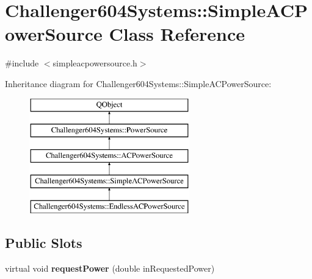 \hypertarget{class_challenger604_systems_1_1_simple_a_c_power_source}{\section{Challenger604\-Systems\-:\-:Simple\-A\-C\-Power\-Source Class Reference}
\label{class_challenger604_systems_1_1_simple_a_c_power_source}
}


{\ttfamily \#include $<$simpleacpowersource.\-h$>$}

Inheritance diagram for Challenger604\-Systems\-:\-:Simple\-A\-C\-Power\-Source\-:\begin{figure}[H]
\begin{center}
\leavevmode
\includegraphics[height=5.000000cm]{class_challenger604_systems_1_1_simple_a_c_power_source}
\end{center}
\end{figure}
\subsection*{Public Slots}
\begin{DoxyCompactItemize}
\item 
\hypertarget{class_challenger604_systems_1_1_simple_a_c_power_source_a9f35b05f8a01cd0baa2d6de5fc1df083}{virtual void {\bfseries request\-Power} (double in\-Requested\-Power)}\label{class_challenger604_systems_1_1_simple_a_c_power_source_a9f35b05f8a01cd0baa2d6de5fc1df083}

\end{DoxyCompactItemize}
